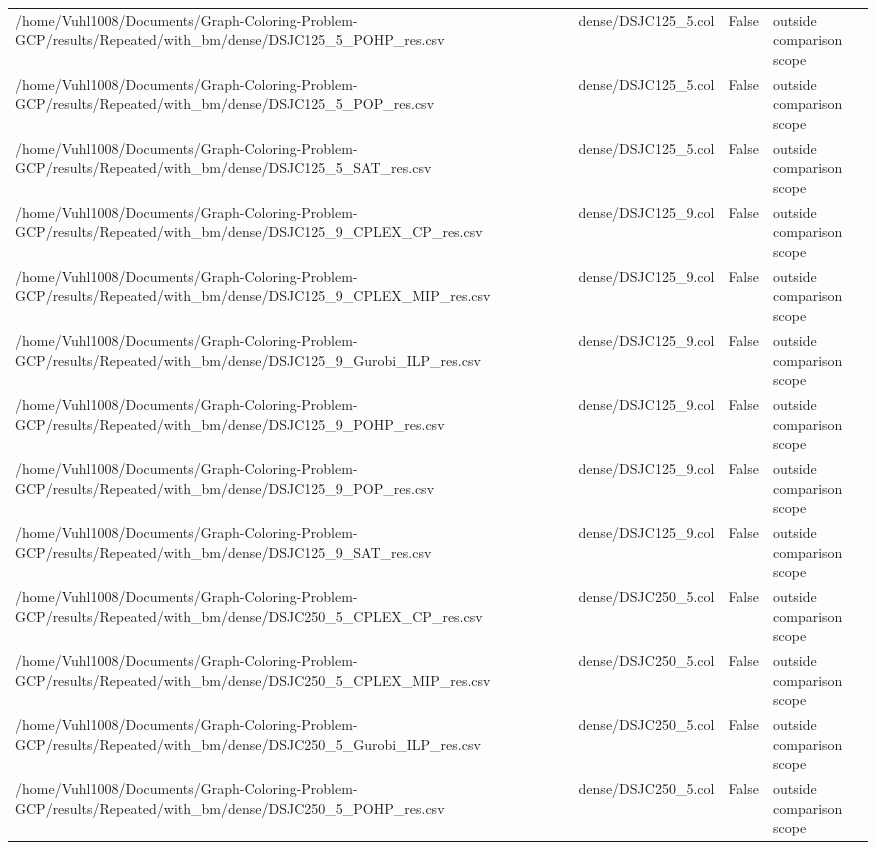 \begin{table}[htbp]
\begin{tabular}{llll}
/home/Vuhl1008/Documents/Graph-Coloring-Problem-GCP/results/Repeated/with\_bm/dense/DSJC125\_5\_POHP\_res.csv & dense/DSJC125\_5.col & False & outside comparison scope \\
/home/Vuhl1008/Documents/Graph-Coloring-Problem-GCP/results/Repeated/with\_bm/dense/DSJC125\_5\_POP\_res.csv & dense/DSJC125\_5.col & False & outside comparison scope \\
/home/Vuhl1008/Documents/Graph-Coloring-Problem-GCP/results/Repeated/with\_bm/dense/DSJC125\_5\_SAT\_res.csv & dense/DSJC125\_5.col & False & outside comparison scope \\
/home/Vuhl1008/Documents/Graph-Coloring-Problem-GCP/results/Repeated/with\_bm/dense/DSJC125\_9\_CPLEX\_CP\_res.csv & dense/DSJC125\_9.col & False & outside comparison scope \\
/home/Vuhl1008/Documents/Graph-Coloring-Problem-GCP/results/Repeated/with\_bm/dense/DSJC125\_9\_CPLEX\_MIP\_res.csv & dense/DSJC125\_9.col & False & outside comparison scope \\
/home/Vuhl1008/Documents/Graph-Coloring-Problem-GCP/results/Repeated/with\_bm/dense/DSJC125\_9\_Gurobi\_ILP\_res.csv & dense/DSJC125\_9.col & False & outside comparison scope \\
/home/Vuhl1008/Documents/Graph-Coloring-Problem-GCP/results/Repeated/with\_bm/dense/DSJC125\_9\_POHP\_res.csv & dense/DSJC125\_9.col & False & outside comparison scope \\
/home/Vuhl1008/Documents/Graph-Coloring-Problem-GCP/results/Repeated/with\_bm/dense/DSJC125\_9\_POP\_res.csv & dense/DSJC125\_9.col & False & outside comparison scope \\
/home/Vuhl1008/Documents/Graph-Coloring-Problem-GCP/results/Repeated/with\_bm/dense/DSJC125\_9\_SAT\_res.csv & dense/DSJC125\_9.col & False & outside comparison scope \\
/home/Vuhl1008/Documents/Graph-Coloring-Problem-GCP/results/Repeated/with\_bm/dense/DSJC250\_5\_CPLEX\_CP\_res.csv & dense/DSJC250\_5.col & False & outside comparison scope \\
/home/Vuhl1008/Documents/Graph-Coloring-Problem-GCP/results/Repeated/with\_bm/dense/DSJC250\_5\_CPLEX\_MIP\_res.csv & dense/DSJC250\_5.col & False & outside comparison scope \\
/home/Vuhl1008/Documents/Graph-Coloring-Problem-GCP/results/Repeated/with\_bm/dense/DSJC250\_5\_Gurobi\_ILP\_res.csv & dense/DSJC250\_5.col & False & outside comparison scope \\
/home/Vuhl1008/Documents/Graph-Coloring-Problem-GCP/results/Repeated/with\_bm/dense/DSJC250\_5\_POHP\_res.csv & dense/DSJC250\_5.col & False & outside comparison scope \\

\end{tabular}
\end{table}
